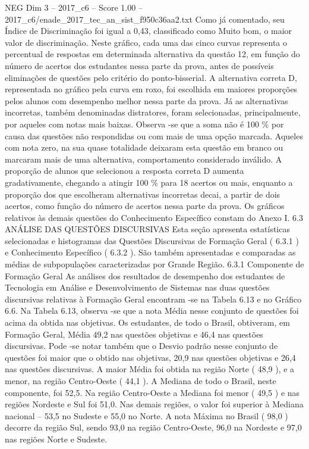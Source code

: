 \begin{textsample}{NEG Dim 3 – 2017\_c6 – Score 1.00 – 2017\_c6/enade\_2017\_tec\_an\_sist\_f950c36aa2.txt}
Como já comentado, seu Índice de Discriminação foi igual a 0,43, classificado como Muito bom, o maior valor de discriminação.
Neste gráfico, cada uma das cinco curvas representa o percentual de respostas em determinada alternativa da questão 12, em função do número de acertos dos estudantes nessa parte da prova, antes de possíveis eliminações de questões pelo critério do ponto-bisserial.
A alternativa correta D, representada no gráfico pela curva em roxo, foi escolhida em maiores proporções pelos alunos com desempenho melhor nessa parte da prova.
Já as alternativas incorretas, também denominadas distratores, foram selecionadas, principalmente, por aqueles com notas mais baixas.
Observa -se que a soma não é 100 \% por causa das questões não respondidas ou com mais de uma opção marcada.
Aqueles com nota zero, na sua quase totalidade deixaram esta questão em branco ou marcaram mais de uma alternativa, comportamento considerado inválido.
A proporção de alunos que selecionou a resposta correta D aumenta gradativamente, chegando a atingir 100 \% para 18 acertos ou mais, enquanto a proporção dos que escolheram alternativas incorretas decai, a partir de dois acertos, como função do número de acertos nessa parte da prova.
Os gráficos relativos às demais questões do Conhecimento Específico constam do Anexo I. 6.3 ANÁLISE DAS QUESTÕES DISCURSIVAS Esta seção apresenta estatísticas selecionadas e histogramas das Questões Discursivas de Formação Geral ( 6.3.1 ) e Conhecimento Específico ( 6.3.2 ).
São também apresentadas e comparadas as médias de subpopulações caracterizadas por Grande Região. 6.3.1 Componente de Formação Geral As análises dos resultados de desempenho dos estudantes de Tecnologia em Análise e Desenvolvimento de Sistemas nas duas questões discursivas relativas à Formação Geral encontram -se na Tabela 6.13 e no Gráfico 6.6.
Na Tabela 6.13, observa -se que a nota Média nesse conjunto de questões foi acima da obtida nas objetivas.
Os estudantes, de todo o Brasil, obtiveram, em Formação Geral, Média 49,2 nas questões objetivas e 46,4 nas questões discursivas.
Pode -se notar também que o Desvio padrão nesse conjunto de questões foi maior que o obtido nas objetivas, 20,9 nas questões objetivas e 26,4 nas questões discursivas.
A maior Média foi obtida na região Norte ( 48,9 ), e a menor, na região Centro-Oeste ( 44,1 ).
A Mediana de todo o Brasil, neste componente, foi 52,5.
Na região Centro-Oeste a Mediana foi menor ( 49,5 ) e nas regiões Nordeste e Sul foi 51,0.
Nas demais regiões, o valor foi superior à Mediana nacional – 53,5 no Sudeste e 55,0 no Norte.
A nota Máxima no Brasil ( 98,0 ) decorre da região Sul, sendo 93,0 na região Centro-Oeste, 96,0 na Nordeste e 97,0 nas regiões Norte e Sudeste.

\end{textsample}

